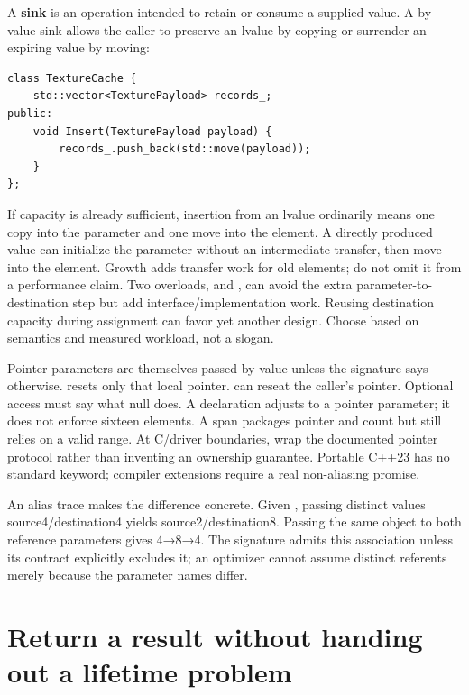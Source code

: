 A \textbf{sink} is an operation intended to retain or consume a supplied value. A by-value sink allows the caller to preserve an lvalue by copying or surrender an expiring value by moving:

\begin{verbatim}
class TextureCache {
    std::vector<TexturePayload> records_;
public:
    void Insert(TexturePayload payload) {
        records_.push_back(std::move(payload));
    }
};
\end{verbatim}

If capacity is already sufficient, insertion from an lvalue ordinarily means one copy into the parameter and one move into the element. A directly produced value can initialize the parameter without an intermediate transfer, then move into the element. Growth adds transfer work for old elements; do not omit it from a performance claim. Two overloads,  and , can avoid the extra parameter-to-destination step but add interface/implementation work. Reusing destination capacity during assignment can favor yet another design. Choose based on semantics and measured workload, not a slogan.

Pointer parameters are themselves passed by value unless the signature says otherwise.  resets only that local pointer.  can reseat the caller's pointer. Optional access must say what null does. A declaration  adjusts to a pointer parameter; it does not enforce sixteen elements. A span packages pointer and count but still relies on a valid range. At C/driver boundaries, wrap the documented pointer protocol rather than inventing an ownership guarantee. Portable C++23 has no standard  keyword; compiler extensions require a real non-aliasing promise.

An alias trace makes the difference concrete. Given , passing distinct values source4/destination4 yields source2/destination8. Passing the same object to both reference parameters gives 4→8→4. The signature admits this association unless its contract explicitly excludes it; an optimizer cannot assume distinct referents merely because the parameter names differ.

\section{Return a result without handing out a lifetime problem}\label{01-foundations-i-ch003-return-a-result-without-handing-out-a-lifetime-problem}

